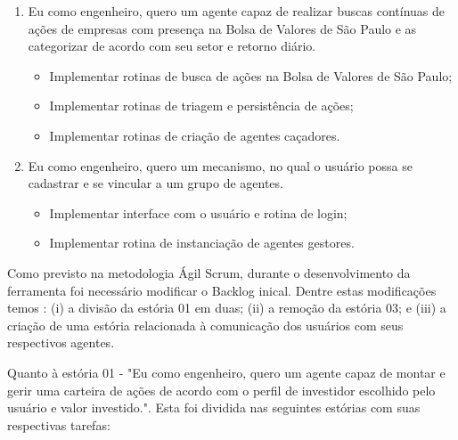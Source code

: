 \begin{enumerate}
\item Eu como engenheiro, quero um agente capaz de realizar buscas contínuas de ações de empresas com presença na Bolsa de Valores de São Paulo e as categorizar de acordo com seu setor e retorno diário.
		\begin{itemize}
		\item Implementar rotinas de busca de ações na Bolsa de Valores de São Paulo;
		\item Implementar rotinas de triagem e persistência de ações;
		\item Implementar rotinas de criação de agentes caçadores.
		\end{itemize}

\item Eu como engenheiro, quero um mecanismo, no qual o usuário possa se cadastrar e se vincular a um grupo de agentes.
		\begin{itemize}
		\item Implementar interface com o usuário e rotina de login;
		\item Implementar rotina de instanciação de agentes gestores.
		\end{itemize}

\end{enumerate}

Como previsto na metodologia Ágil Scrum, durante o desenvolvimento da ferramenta foi necessário modificar o Backlog inical. Dentre estas modificações temos : (i) a divisão da estória 01 em duas; (ii) a remoção da estória 03; e (iii) a criação de uma estória relacionada à comunicação dos usuários com seus respectivos agentes.

Quanto à estória 01 - "Eu como engenheiro, quero um agente capaz de montar e gerir uma carteira de ações de acordo com o perfil de investidor escolhido pelo usuário e valor investido.". Esta foi dividida nas seguintes estórias com suas respectivas tarefas:

